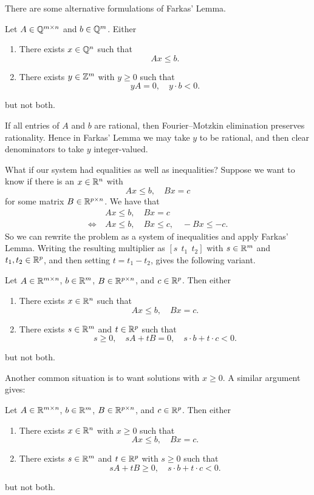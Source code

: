There are some alternative formulations of Farkas' Lemma.
\begin{lemma}
	Let $A \in \mathbb{Q}^{m\times n}$ and $b \in \mathbb{Q}^m$. Either
	\begin{enumerate}[label = (\roman*)]
		\item There exists $x \in \mathbb{Q}^n$ such that \[
			Ax \le b
		.\] 
		\item There exists $y \in \mathbb{Z}^m$ with $y \ge 0$ such that \[
			y A  = 0, \quad y \cdot b < 0
		.\]
		\end{enumerate}
	but not both.
\end{lemma}

If all entries of $A$ and $b$ are rational, then Fourier--Motzkin elimination preserves rationality. Hence in Farkas' Lemma we may take $y$ to be rational, and then clear denominators to take $y$ integer-valued.

What if our system had equalities as well as inequalities? Suppose we want to know if there is an $x \in \mathbb{R}^n$ with \[
	Ax \le b, \quad Bx = c
\] for some matrix $B \in \mathbb{R}^{p\times n}$. We have that
\begin{align*}
	&Ax \le b, \quad Bx = c \\
	\iff\ &Ax \le b, \quad Bx \le c, \quad -Bx \le -c
.\end{align*}
So we can rewrite the problem as a system of inequalities and apply Farkas' Lemma. Writing the resulting multiplier as $\left[s\ \ t_1\ \ t_2\right]$ with $s \in \mathbb{R}^m$ and $t_1,t_2 \in \mathbb{R}^p$, and then setting $t = t_1 - t_2$, gives the following variant.

\begin{lemma}[Farkas' II] \label{4-1-2}
	Let $A \in \mathbb{R}^{m\times n}$, $b \in \mathbb{R}^m$, $B \in \mathbb{R}^{p \times n}$, and $c \in \mathbb{R}^p$. Then either
	\begin{enumerate}[label = (\roman*)]
		\item There exists $x \in \mathbb{R}^n$ such that \[
			Ax \le b, \quad Bx = c
		.\] 
		\item There exists $s \in \mathbb{R}^m$ and $t \in \mathbb{R}^p$ such that \[
			s \ge 0, \quad sA + tB = 0, \quad s \cdot b + t \cdot c < 0
			.\]
	\end{enumerate}
	but not both.
\end{lemma}

Another common situation is to want solutions with $x \ge 0$. A similar argument gives:
\begin{lemma}
	Let $A \in \mathbb{R}^{m\times n}$, $b \in \mathbb{R}^m$, $B \in \mathbb{R}^{p \times n}$, and $c \in \mathbb{R}^p$. Then either
	\begin{enumerate}[label = (\roman*)]
		\item There exists $x \in \mathbb{R}^n$ with $x \ge 0$ such that \[
			Ax \le b, \quad Bx = c
		.\] 
		\item There exists $s \in \mathbb{R}^m$ and $t \in \mathbb{R}^p$ with $s \ge 0$ such that \[
			sA + tB \ge 0, \quad s \cdot b + t \cdot c < 0
			.\]
	\end{enumerate}
	but not both.
\end{lemma}

